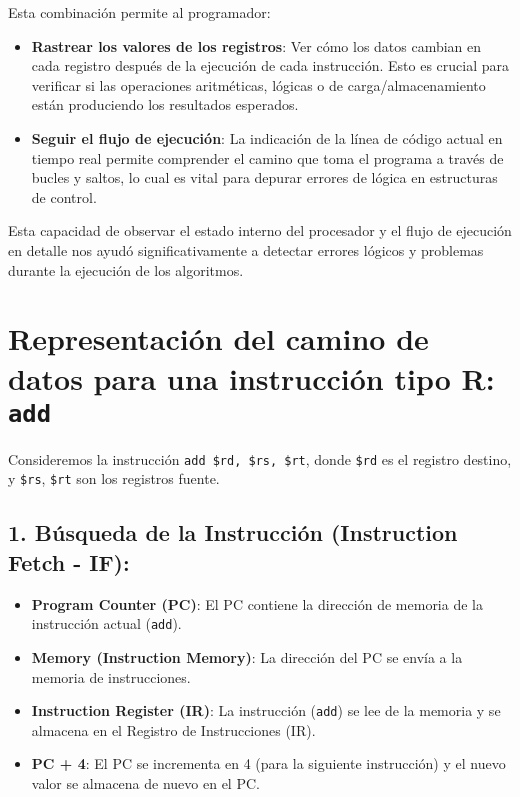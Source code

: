 \documentclass{article}
\begin{document}
Esta combinación permite al programador:
\begin{itemize}
    \item \textbf{Rastrear los valores de los registros}: Ver cómo los datos cambian en cada registro después de la ejecución de cada instrucción. Esto es crucial para verificar si las operaciones aritméticas, lógicas o de carga/almacenamiento están produciendo los resultados esperados.
    \item \textbf{Seguir el flujo de ejecución}: La indicación de la línea de código actual en tiempo real permite comprender el camino que toma el programa a través de bucles y saltos, lo cual es vital para depurar errores de lógica en estructuras de control.
\end{itemize}
Esta capacidad de observar el estado interno del procesador y el flujo de ejecución en detalle nos ayudó significativamente a detectar errores lógicos y problemas durante la ejecución de los algoritmos.

\section{Representación del camino de datos para una instrucción tipo R: \texttt{add}}
Consideremos la instrucción \texttt{add \$rd, \$rs, \$rt}, donde \texttt{\$rd} es el registro destino, y \texttt{\$rs}, \texttt{\$rt} son los registros fuente.

\subsection*{1. Búsqueda de la Instrucción (Instruction Fetch - IF):}
\begin{itemize}
    \item \textbf{Program Counter (PC)}: El PC contiene la dirección de memoria de la instrucción actual (\texttt{add}).
    \item \textbf{Memory (Instruction Memory)}: La dirección del PC se envía a la memoria de instrucciones.
    \item \textbf{Instruction Register (IR)}: La instrucción (\texttt{add}) se lee de la memoria y se almacena en el Registro de Instrucciones (IR).
    \item \textbf{PC + 4}: El PC se incrementa en 4 (para la siguiente instrucción) y el nuevo valor se almacena de nuevo en el PC.
\end{itemize}
\end{document}
